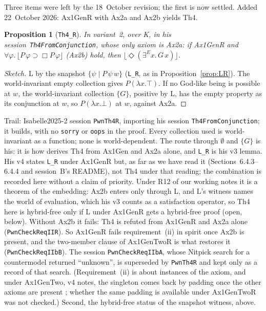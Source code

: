 \documentclass[11pt,a4paper]{article}
\newcommand{\valid}[1]{\lfloor #1 \rfloor}
\newcommand{\Nec}{\Box}
\newcommand{\Pos}{\Diamond}
\newcommand{\exE}{\exists^{E}}
\newcommand{\lean}[1]{\texttt{#1}}
\newtheorem{proposition}[theorem]{Proposition}
\theoremstyle{definition}
\theoremstyle{remark}
\begin{document}
Three items were left by the 18~October revision; the first is now settled.
Added 22~October 2026: Ax1GenR with Ax2a and Ax2b yields Th4.
\begin{proposition}[\lean{Th4\_R}]
\label{prop:Th4R}
In variant~2, over K, in his session~\lean{Th4FromConjunction}, whose only
axiom is Ax2a: if Ax1GenR and \(\forall\varphi.\,\valid{P\,\varphi \supset
\Nec P\,\varphi}\) (Ax2b) hold, then \(\valid{\Pos(\exE x.\,G\,x)}\).
\end{proposition}
\begin{proof}[Sketch]
L by the snapshot \(\{\psi \mid P\,\psi\,w\}\) (\lean{L\_R}, as in
Proposition~\ref{prop:LR}).
The world-invariant empty collection gives \(P(\lambda x.\top)\).
If no God-like being is possible at \(w\), the world-invariant collection
\(\{G\}\), positive by L, has the empty property as its conjunction at
\(w\), so \(P(\lambda x.\bot)\) at \(w\), against Ax2a.
\end{proof}
Trail: Isabelle2025-2 session \lean{PwnTh4R}, importing his session
\lean{Th4FromConjunction}; it builds, with no \lean{sorry} or \lean{oops} in
the proof.
Every collection used is world-invariant as a function; none is
world-dependent.
The route through \(\emptyset\) and \(\{G\}\) is his: it is how
\cite[v4, Sect.~6.4]{benzmuellerPWN2026} derives Th4 from Ax1Gen and Ax2a
alone, and \lean{L\_R} is his v3 lemma.
His v4 states \lean{L\_R} under Ax1GenR but, as far as we have read it
(Sections~6.4.3--6.4.4 and session~B's README), not Th4 under that reading;
the combination is recorded here without a claim of priority.
Under R12 of our working notes it is a theorem of the embedding: Ax2b enters
only through L, and L's witness names the world of evaluation, which his v3
counts as a satisfaction operator, so Th4 here is hybrid-free only if L
under Ax1GenR gets a hybrid-free proof (open, below).
Without Ax2b it fails: Th4 is refuted from Ax1GenR and Ax2a
alone (\lean{PwnCheckReqIIR}).
So Ax1GenR fails requirement~(ii) in spirit once Ax2b is present, and the
two-member clause of Ax1GenTwoR is what restores it
(\lean{PwnCheckReqIIbB}).
The session \lean{PwnCheckReqIIbA}, whose Nitpick search for a countermodel
returned ``unknown'', is superseded by \lean{PwnTh4R} and kept only as a record
of that search.
(Requirement~(ii) is about instances of the axiom, and under Ax1GenTwo, v4
notes, the singleton comes back by padding once the other axioms are present
\cite[v4, abstract]{benzmuellerPWN2026}; whether the same padding is
available under Ax1GenTwoR was not checked.)
Second, the hybrid-free status of the snapshot witness, above.
\end{document}

